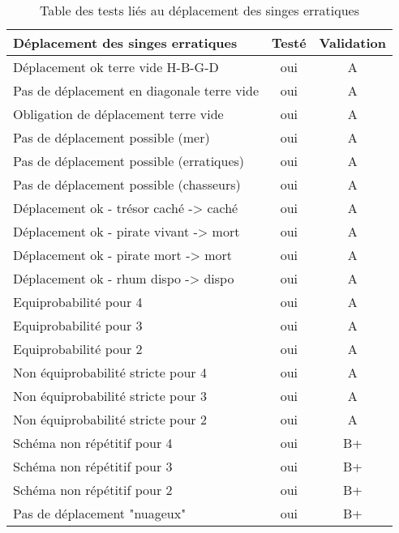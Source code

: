 \begin{table}[!h]
\begin{center}
\begin{tabular}{|p{10cm}|c|c|}
\hline
\textbf{Déplacement des singes erratiques} & \textbf{Testé} & \textbf{Validation} \\
\hline
Déplacement ok terre vide H-B-G-D			& oui & A\\\hline
Pas de déplacement en diagonale terre vide	& oui & A\\\hline
Obligation de déplacement terre vide		& oui & A\\\hline
Pas de déplacement possible (mer)			& oui & A\\\hline
Pas de déplacement possible (erratiques)	& oui & A\\\hline
Pas de déplacement possible (chasseurs)		& oui & A\\\hline
Déplacement ok - trésor caché -> caché		& oui & A\\\hline
Déplacement ok - pirate vivant -> mort		& oui & A\\\hline
Déplacement ok - pirate mort -> mort		& oui & A\\\hline
Déplacement ok - rhum dispo -> dispo		& oui & A\\\hline
Equiprobabilité pour 4						& oui & A\\\hline
Equiprobabilité pour 3						& oui & A\\\hline
Equiprobabilité pour 2						& oui & A\\\hline
Non équiprobabilité stricte pour 4			& oui & A\\\hline
Non équiprobabilité stricte pour 3			& oui & A\\\hline
Non équiprobabilité stricte pour 2			& oui & A\\\hline
Schéma non répétitif pour 4					& oui & B+\\\hline
Schéma non répétitif pour 3					& oui & B+\\\hline
Schéma non répétitif pour 2					& oui & B+\\\hline
Pas de déplacement "nuageux"				& oui & B+\\\hline
\end{tabular}
\end{center}
\caption{Table des tests liés au déplacement des singes erratiques}
\end{table}

